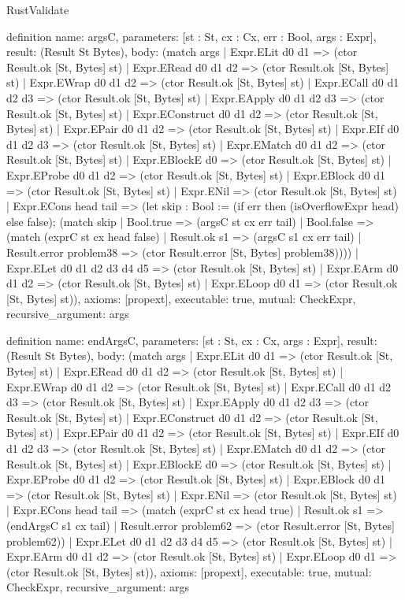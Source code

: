 \begin{lexlean}{RustValidate}
\begin{semanticmodule}
definition{
  name: argsC,
  parameters: [st : St, cx : Cx, err : Bool, args : Expr],
  result: (Result St Bytes),
  body: (match args
    | Expr.ELit d0 d1 => (ctor Result.ok [St, Bytes] st)
    | Expr.ERead d0 d1 d2 => (ctor Result.ok [St, Bytes] st)
    | Expr.EWrap d0 d1 d2 => (ctor Result.ok [St, Bytes] st)
    | Expr.ECall d0 d1 d2 d3 => (ctor Result.ok [St, Bytes] st)
    | Expr.EApply d0 d1 d2 d3 => (ctor Result.ok [St, Bytes] st)
    | Expr.EConstruct d0 d1 d2 => (ctor Result.ok [St, Bytes] st)
    | Expr.EPair d0 d1 d2 => (ctor Result.ok [St, Bytes] st)
    | Expr.EIf d0 d1 d2 d3 => (ctor Result.ok [St, Bytes] st)
    | Expr.EMatch d0 d1 d2 => (ctor Result.ok [St, Bytes] st)
    | Expr.EBlockE d0 => (ctor Result.ok [St, Bytes] st)
    | Expr.EProbe d0 d1 d2 => (ctor Result.ok [St, Bytes] st)
    | Expr.EBlock d0 d1 => (ctor Result.ok [St, Bytes] st)
    | Expr.ENil => (ctor Result.ok [St, Bytes] st)
    | Expr.ECons head tail => (let skip : Bool := (if err then (isOverflowExpr head) else false); (match skip
      | Bool.true => (argsC st cx err tail)
      | Bool.false => (match (exprC st cx head false)
        | Result.ok s1 => (argsC s1 cx err tail)
        | Result.error problem38 => (ctor Result.error [St, Bytes] problem38))))
    | Expr.ELet d0 d1 d2 d3 d4 d5 => (ctor Result.ok [St, Bytes] st)
    | Expr.EArm d0 d1 d2 => (ctor Result.ok [St, Bytes] st)
    | Expr.ELoop d0 d1 => (ctor Result.ok [St, Bytes] st)),
  axioms: [propext],
  executable: true,
  mutual: CheckExpr,
  recursive_argument: args
}

definition{
  name: endArgsC,
  parameters: [st : St, cx : Cx, args : Expr],
  result: (Result St Bytes),
  body: (match args
    | Expr.ELit d0 d1 => (ctor Result.ok [St, Bytes] st)
    | Expr.ERead d0 d1 d2 => (ctor Result.ok [St, Bytes] st)
    | Expr.EWrap d0 d1 d2 => (ctor Result.ok [St, Bytes] st)
    | Expr.ECall d0 d1 d2 d3 => (ctor Result.ok [St, Bytes] st)
    | Expr.EApply d0 d1 d2 d3 => (ctor Result.ok [St, Bytes] st)
    | Expr.EConstruct d0 d1 d2 => (ctor Result.ok [St, Bytes] st)
    | Expr.EPair d0 d1 d2 => (ctor Result.ok [St, Bytes] st)
    | Expr.EIf d0 d1 d2 d3 => (ctor Result.ok [St, Bytes] st)
    | Expr.EMatch d0 d1 d2 => (ctor Result.ok [St, Bytes] st)
    | Expr.EBlockE d0 => (ctor Result.ok [St, Bytes] st)
    | Expr.EProbe d0 d1 d2 => (ctor Result.ok [St, Bytes] st)
    | Expr.EBlock d0 d1 => (ctor Result.ok [St, Bytes] st)
    | Expr.ENil => (ctor Result.ok [St, Bytes] st)
    | Expr.ECons head tail => (match (exprC st cx head true)
      | Result.ok s1 => (endArgsC s1 cx tail)
      | Result.error problem62 => (ctor Result.error [St, Bytes] problem62))
    | Expr.ELet d0 d1 d2 d3 d4 d5 => (ctor Result.ok [St, Bytes] st)
    | Expr.EArm d0 d1 d2 => (ctor Result.ok [St, Bytes] st)
    | Expr.ELoop d0 d1 => (ctor Result.ok [St, Bytes] st)),
  axioms: [propext],
  executable: true,
  mutual: CheckExpr,
  recursive_argument: args
}


\end{semanticmodule}
\end{lexlean}
